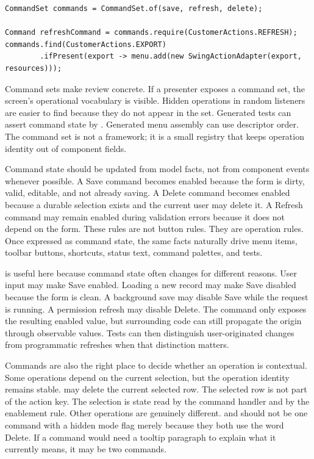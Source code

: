 \begin{lstlisting}[caption={A deterministic command registry.}]
CommandSet commands = CommandSet.of(save, refresh, delete);

Command refreshCommand = commands.require(CustomerActions.REFRESH);
commands.find(CustomerActions.EXPORT)
        .ifPresent(export -> menu.add(new SwingActionAdapter(export, resources)));
\end{lstlisting}

Command sets make review concrete. If a presenter exposes a command set, the
screen's operational vocabulary is visible. Hidden operations in random
listeners are easier to find because they do not appear in the set. Generated
tests can assert command state by . Generated menu assembly can
use descriptor order. The command set is not a framework; it is a small
registry that keeps operation identity out of component fields.

Command state should be updated from model facts, not from component events
whenever possible. A Save command becomes enabled because the form is dirty,
valid, editable, and not already saving. A Delete command becomes enabled
because a durable selection exists and the current user may delete it. A
Refresh command may remain enabled during validation errors because it does
not depend on the form. These rules are not button rules. They are operation
rules. Once expressed as command state, the same facts naturally drive menu
items, toolbar buttons, shortcuts, status text, command palettes, and tests.

 is useful here because command state often changes for
different reasons. User input may make Save enabled. Loading a new record may
make Save disabled because the form is clean. A background save may disable
Save while the request is running. A permission refresh may disable Delete.
The command only exposes the resulting enabled value, but surrounding code can
still propagate the origin through observable values. Tests can then
distinguish user-originated changes from programmatic refreshes when that
distinction matters.

Commands are also the right place to decide whether an operation is
contextual. Some operations depend on the current selection, but the operation
identity remains stable.  may delete the current
selected row. The selected row is not part of the action key. The selection is
state read by the command handler and by the enablement rule. Other operations
are genuinely different.  and
 should not be one command with a hidden
mode flag merely because they both use the word Delete. If a command would
need a tooltip paragraph to explain what it currently means, it may be two
commands.

